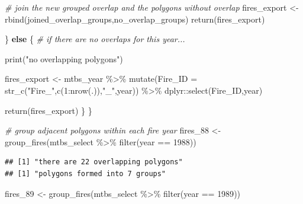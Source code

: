 \documentclass[
]{book}
\newenvironment{Shaded}{\begin{snugshade}}{\end{snugshade}}
\newcommand{\AttributeTok}[1]{\textcolor[rgb]{0.77,0.63,0.00}{#1}}
\newcommand{\CommentTok}[1]{\textcolor[rgb]{0.56,0.35,0.01}{\textit{#1}}}
\newcommand{\ControlFlowTok}[1]{\textcolor[rgb]{0.13,0.29,0.53}{\textbf{#1}}}
\newcommand{\DecValTok}[1]{\textcolor[rgb]{0.00,0.00,0.81}{#1}}
\newcommand{\FunctionTok}[1]{\textcolor[rgb]{0.00,0.00,0.00}{#1}}
\newcommand{\NormalTok}[1]{#1}
\newcommand{\OtherTok}[1]{\textcolor[rgb]{0.56,0.35,0.01}{#1}}
\newcommand{\SpecialCharTok}[1]{\textcolor[rgb]{0.00,0.00,0.00}{#1}}
\newcommand{\StringTok}[1]{\textcolor[rgb]{0.31,0.60,0.02}{#1}}
\begin{document}
\begin{Shaded}
\begin{Highlighting}[]
    \CommentTok{\# join the new grouped overlap and the polygons without overlap}
\NormalTok{    fires\_export }\OtherTok{\textless{}{-}} \FunctionTok{rbind}\NormalTok{(joined\_overlap\_groups,no\_overlap\_groups)}
    \FunctionTok{return}\NormalTok{(fires\_export)}
    
\NormalTok{    \} }\ControlFlowTok{else}\NormalTok{ \{ }\CommentTok{\# if there are no overlaps for this year...}
      
      \FunctionTok{print}\NormalTok{(}\StringTok{"no overlapping polygons"}\NormalTok{)}
      
\NormalTok{      fires\_export }\OtherTok{\textless{}{-}}\NormalTok{ mtbs\_year }\SpecialCharTok{\%\textgreater{}\%}
        \FunctionTok{mutate}\NormalTok{(}\AttributeTok{Fire\_ID =} \FunctionTok{str\_c}\NormalTok{(}\StringTok{"Fire\_"}\NormalTok{,}\FunctionTok{c}\NormalTok{(}\DecValTok{1}\SpecialCharTok{:}\FunctionTok{nrow}\NormalTok{(.)),}\StringTok{"\_"}\NormalTok{,year)) }\SpecialCharTok{\%\textgreater{}\%}
\NormalTok{        dplyr}\SpecialCharTok{::}\FunctionTok{select}\NormalTok{(Fire\_ID,year)}
      
      \FunctionTok{return}\NormalTok{(fires\_export)}
\NormalTok{  \}}
\NormalTok{\}}
\end{Highlighting}
\end{Shaded}

\begin{Shaded}
\begin{Highlighting}[]
\CommentTok{\# group adjacent polygons within each fire year}
\NormalTok{fires\_88 }\OtherTok{\textless{}{-}} \FunctionTok{group\_fires}\NormalTok{(mtbs\_select }\SpecialCharTok{\%\textgreater{}\%}  \FunctionTok{filter}\NormalTok{(year }\SpecialCharTok{==} \DecValTok{1988}\NormalTok{))}
\end{Highlighting}
\end{Shaded}

\begin{verbatim}
## [1] "there are 22 overlapping polygons"
## [1] "polygons formed into 7 groups"
\end{verbatim}

\begin{Shaded}
\begin{Highlighting}[]
\NormalTok{fires\_89 }\OtherTok{\textless{}{-}} \FunctionTok{group\_fires}\NormalTok{(mtbs\_select }\SpecialCharTok{\%\textgreater{}\%}  \FunctionTok{filter}\NormalTok{(year }\SpecialCharTok{==} \DecValTok{1989}\NormalTok{))}
\end{Highlighting}
\end{Shaded}
\end{document}
